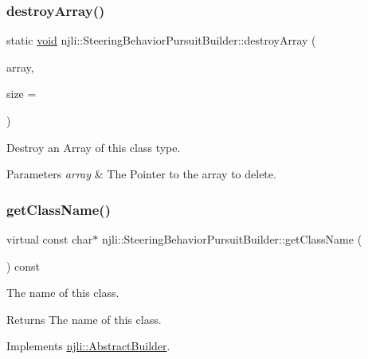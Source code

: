\subsubsection{\texorpdfstring{destroy\+Array()}{destroyArray()}}
{\footnotesize\ttfamily static \mbox{\hyperlink{_thread_8h_af1e856da2e658414cb2456cb6f7ebc66}{void}} njli\+::\+Steering\+Behavior\+Pursuit\+Builder\+::destroy\+Array (\begin{DoxyParamCaption}\item[{\mbox{\hyperlink{classnjli_1_1_steering_behavior_pursuit_builder}{Steering\+Behavior\+Pursuit\+Builder}} $\ast$$\ast$}]{array,  }\item[{const \mbox{\hyperlink{_util_8h_a10e94b422ef0c20dcdec20d31a1f5049}{u32}}}]{size = {} }\end{DoxyParamCaption})\hspace{0.3cm}{\ttfamily [static]}}

Destroy an Array of this class type.


\begin{DoxyParams}{Parameters}
{\em array} & The Pointer to the array to delete. \\
\hline
\end{DoxyParams}
\mbox{\label{classnjli_1_1_steering_behavior_pursuit_builder_ab927fa55b0237f4383347c00f61dc9e2}} 
\subsubsection{\texorpdfstring{get\+Class\+Name()}{getClassName()}}
{\footnotesize\ttfamily virtual const char$\ast$ njli\+::\+Steering\+Behavior\+Pursuit\+Builder\+::get\+Class\+Name (\begin{DoxyParamCaption}{ }\end{DoxyParamCaption}) const\hspace{0.3cm}{\ttfamily [virtual]}}

The name of this class.

\begin{DoxyReturn}{Returns}
The name of this class. 
\end{DoxyReturn}


Implements \mbox{\hyperlink{classnjli_1_1_abstract_builder_a902f73ea78031b06aca183a417f3413b}{njli\+::\+Abstract\+Builder}}.

